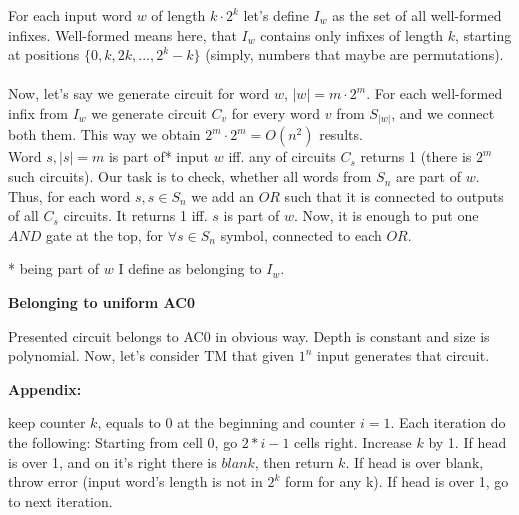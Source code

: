 \documentclass[12pt]{article}
\begin{document}
For each input word $w$ of length $k\cdot2^k$ let's define $I_{w}$ as the set of all well-formed infixes. Well-formed means here, that $I_w$ contains only infixes of length $k$, starting at positions $\{0, k, 2k, ... , 2^k - k\}$ (simply, numbers that maybe are permutations).
\\\\

Now, let's say we generate circuit for word $w$, $|w| = m\cdot2^m$.
For each well-formed infix from $I_w$ we generate circuit $C_v$ for every word $v$ from $S_{|w|}$, and we connect both them. This way we obtain $2^m \cdot 2^m = O(n^2)$ results. 
\\

Word $s, |s| = m$ is part of* input $w$ iff. any of circuits $C_s$ returns 1 (there is $2^m$ such circuits). Our task is to check, whether all words from $S_n$ are part of $w$. Thus, for each word $s, s \in S_n$ we add an $OR$ such that it is connected to outputs of all $C_s$ circuits. It returns 1 iff. $s$ is part of $w$.
Now, it is enough to put one $AND$ gate at the top, for $\forall{s \in S_n}$ symbol, connected to each $OR$.

* being part of $w$ I define as belonging to $I_w$.


\textbf{Belonging to uniform AC0}

Presented circuit belongs to AC0 in obvious way. Depth is constant and size is polynomial. Now, let's consider TM that given $1^n$ input generates that circuit.

\textbf{Appendix:}

keep counter $k$, equals to 0 at the beginning and counter $i = 1$. Each iteration do the following:
Starting from cell 0, go $2*i - 1$ cells right. Increase $k$ by 1. If head is over 1, and on it's right there is $blank$, then return $k$. If head is over blank, throw error (input word's length is not in $2^k$ form for any k). If head is over 1, go to next iteration.
\end{document}
